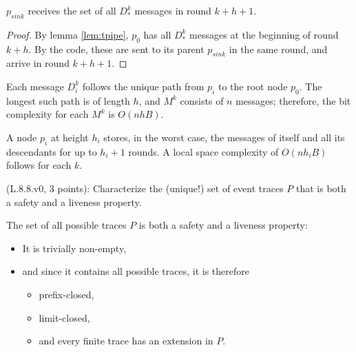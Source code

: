 \begin{theorem}
$p_{sink}$ receives the set of all $D_*^k$ messages in round $k + h + 1$.
\end{theorem}

\begin{proof}
By lemma \ref{lem:tpipe}, $p_0$ has all $D_*^k$ messages at the beginning
of round $k + h$. By the code, these are sent to its parent $p_{sink}$ in the same
round, and arrive in round $k + h + 1$.
\end{proof}

Each message $D_i^k$ follows the unique path from $p_i$ to the root node $p_0$.
The longest such path is of length $h$, and $M^k$ consists of $n$ messages;
therefore, the bit complexity for each $M^k$ is $O(nhB)$.

A node $p_i$ at height $h_i$ stores, in the worst case, the messages of itself and
all its descendants for up to $h_i + 1$ rounds. A local space complexity of
$O(nh_iB)$ follows for each $k$.


\begin{Exc}{(L.8.8.v0, 3 points):}
Characterize the (unique!) set of event traces $P$ that is both
a safety and a liveness property.
\end{Exc}


The set of all possible traces $P$ is both a safety and a liveness property:

\begin{itemize}
\item It is trivially non-empty,
\item and since it contains all possible traces, it is therefore
    \begin{itemize}
    \item prefix-closed,
    \item limit-closed,
    \item and every finite trace has an extension in $P$.
    \end{itemize}
\end{itemize}


